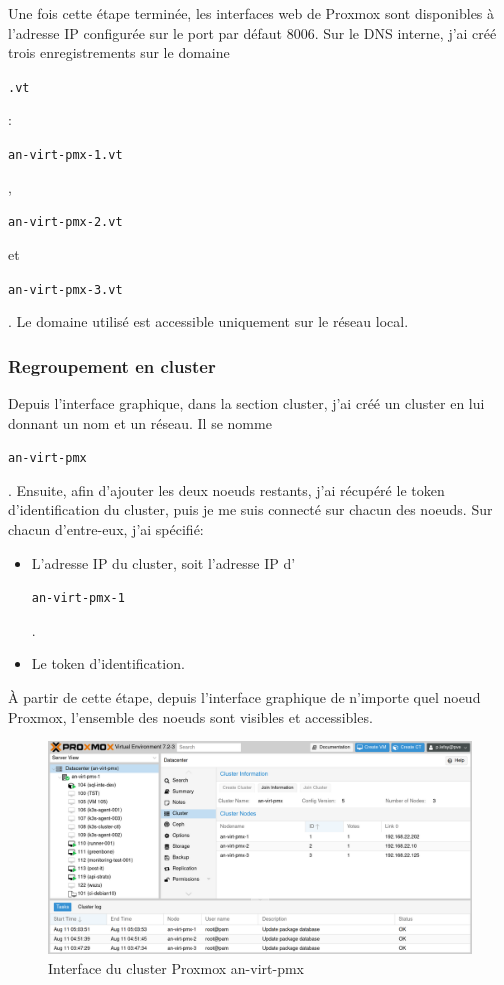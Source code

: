 \documentclass[12pt, a4paper, twoside]{article}
\begin{document}
Une fois cette étape terminée, les interfaces web de \gls{Proxmox} sont disponibles à l'adresse \gls{IP} configurée sur le port par défaut 8006.
Sur le \gls{DNS} interne, j'ai créé trois enregistrements sur le domaine \begin{code}\texttt{.vt}\end{code}: \begin{code}\texttt{an-virt-pmx-1.vt}\end{code}, \begin{code}\texttt{an-virt-pmx-2.vt}\end{code} et \begin{code}\texttt{an-virt-pmx-3.vt}\end{code}.
Le domaine utilisé est accessible uniquement sur le réseau local.

\subsubsection{Regroupement en cluster}
Depuis l'interface graphique, dans la section \gls{cluster}, j'ai créé un \gls{cluster} en lui donnant un nom et un réseau. 
Il se nomme \begin{code}\texttt{an-virt-pmx}\end{code}.
Ensuite, afin d'ajouter les deux noeuds restants, j'ai récupéré le token d'identification du \gls{cluster}, puis je me suis connecté sur chacun des noeuds. 
Sur chacun d'entre-eux, j'ai spécifié:
\begin{itemize}
    \item L'adresse \gls{IP} du \gls{cluster}, soit l'adresse \gls{IP} d'\begin{code}\texttt{an-virt-pmx-1}\end{code}.
    \item Le token d'identification.
\end{itemize}

À partir de cette étape, depuis l'interface graphique de n'importe quel noeud \gls{Proxmox}, l'ensemble des noeuds sont visibles et accessibles.

\begin{figure}[ht!]
    \centering
        \includegraphics[width=\textwidth]{src/interface_proxmox_main.png}
    \caption{Interface du \gls{cluster} \gls{Proxmox} an-virt-pmx}
    \label{fig:proxmox_virt1}
\end{figure}
\end{document}
